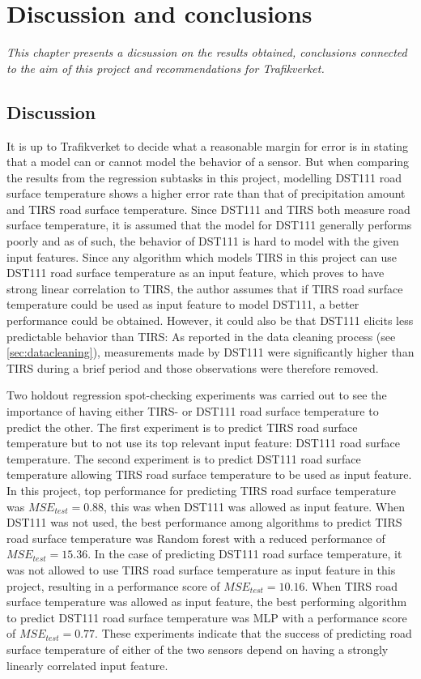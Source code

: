 \chapter{Discussion and conclusions}
\emph{This chapter presents a dicsussion on the results obtained, conclusions connected to the aim of this project and recommendations for Trafikverket.}

\section{Discussion}

	It is up to Trafikverket to decide what a reasonable margin for error is in stating that a model can or cannot model the behavior of a sensor. But when comparing the results from the regression subtasks in this project, modelling DST111 road surface temperature shows a higher error rate than that of precipitation amount and TIRS road surface temperature. Since DST111 and TIRS both measure road surface temperature, it is assumed that the model for DST111 generally performs poorly and as of such, the behavior of DST111 is hard to model with the given input features. Since any algorithm which models TIRS in this project can use DST111 road surface temperature as an input feature, which proves to have strong linear correlation to TIRS, the author assumes that if TIRS road surface temperature could be used as input feature to model DST111, a better performance could be obtained. However, it could also be that DST111 elicits less predictable behavior than TIRS: As reported in the data cleaning process (see \ref{sec:datacleaning}), measurements made by DST111 were significantly higher than TIRS during a brief period and those observations were therefore removed. 

	Two holdout regression spot-checking experiments was carried out to see the importance of having either TIRS- or DST111 road surface temperature to predict the other. The first experiment is to predict TIRS road surface temperature but to not use its top relevant input feature: DST111 road surface temperature. The second experiment is to predict DST111 road surface temperature allowing TIRS road surface temperature to be used as input feature. In this project, top performance for predicting TIRS road surface temperature was $MSE_{test} = 0.88$, this was when DST111 was allowed as input feature. When DST111 was not used, the best performance among algorithms to predict TIRS road surface temperature was Random forest with a reduced performance of $MSE_{test}=15.36$. In the case of predicting DST111 road surface temperature, it was not allowed to use TIRS road surface temperature as input feature in this project, resulting in a performance score of $MSE_{test}=10.16$. When TIRS road surface temperature was allowed as input feature, the best performing algorithm to predict DST111 road surface temperature was MLP with a performance score of $MSE_{test}=0.77$. These experiments indicate that the success of predicting road surface temperature of either of the two sensors depend on having a strongly linearly correlated input feature.

